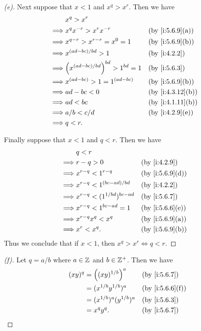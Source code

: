 \begin{proof}[(e)]
  Next suppose that \(x < 1\) and \(x^q > x^r\).
  Then we have
  \begin{align*}
             & x^q > x^r                                                       \\
    \implies & x^q x^{-r} > x^r x^{-r}                   &  & \by{i:5.6.9}[a]  \\
    \implies & x^{q - r} > x^{r - r} = x^0 = 1           &  & \by{i:5.6.9}[b]  \\
    \implies & x^{(ad - bc) / bd} > 1                    &  & \by{i:4.2.2}     \\
    \implies & \pa{x^{(ad - bc) / bd}}^{bd} > 1^{bd} = 1 &  & \by{i:5.6.3}     \\
    \implies & x^{(ad - bc)} > 1 = 1^{(ad - bc)}         &  & \by{i:5.6.9}[b]  \\
    \implies & ad - bc < 0                               &  & \by{i:4.3.12}[b] \\
    \implies & ad < bc                                   &  & \by{i:4.1.11}[b] \\
    \implies & a / b < c / d                             &  & \by{i:4.2.9}[e]  \\
    \implies & q < r.
  \end{align*}

  Finally suppose that \(x < 1\) and \(q < r\).
  Then we have
  \begin{align*}
             & q < r                                                   \\
    \implies & r - q > 0                          &  & \by{i:4.2.9}    \\
    \implies & x^{r - q} < 1^{r - q}              &  & \by{i:5.6.9}[d] \\
    \implies & x^{r - q} < 1^{(bc - ad) / bd}     &  & \by{i:4.2.2}    \\
    \implies & x^{r - q} < (1^{1 / bd})^{bc - ad} &  & \by{i:5.6.7}    \\
    \implies & x^{r - q} < 1^{bc - ad} = 1        &  & \by{i:5.6.6}[e] \\
    \implies & x^{r - q} x^q < x^q                &  & \by{i:5.6.9}[a] \\
    \implies & x^r < x^q.                         &  & \by{i:5.6.9}[b]
  \end{align*}
  Thus we conclude that if \(x < 1\), then \(x^q > x^r \iff q < r\).
\end{proof}

\begin{proof}[(f)]
  Let \(q = a / b\) where \(a \in \mathbb{Z}\) and \(b \in \mathbb{Z}^+\).
  Then we have
  \begin{align*}
    (xy)^q & = \pa{(xy)^{1 / b}}^a         &  & \by{i:5.6.7}    \\
           & = (x^{1 / b} y^{1 / b})^a     &  & \by{i:5.6.6}[f] \\
           & = (x^{1 / b})^a (y^{1 / b})^a &  & \by{i:5.6.3}    \\
           & = x^q y^q.                    &  & \by{i:5.6.7}
  \end{align*}
\end{proof}

